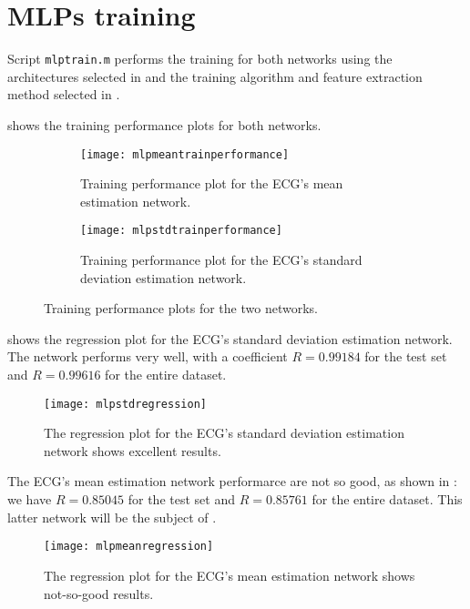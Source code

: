 \section{MLPs training}\label{sec:mlptraining}

Script \texttt{mlptrain.m} performs the training for both networks using the
architectures selected in  and the training
algorithm and feature extraction method selected in
.

 shows the training performance plots for both
networks. 

\begin{figure}[htbp]
	\centering
	\begin{subfigure}{\textwidth}
		\centering
		\texttt{[image: mlpmeantrainperformance]}
		\caption{Training performance plot for the ECG's mean
		estimation network.}\label{fig:mlpmeantrainperformance}
	\end{subfigure}
	\begin{subfigure}{\textwidth}
		\centering
		\texttt{[image: mlpstdtrainperformance]}
		\caption{Training performance plot for the ECG's standard
		deviation estimation network.}\label{fig:mlpstdtrainperformance}
	\end{subfigure}
	\caption{Training performance plots for the two
	networks.}\label{fig:mlptrainperformance}
\end{figure}

 shows the regression plot for the ECG's standard
deviation estimation network. The network performs very well, with a
coefficient \(R = 0.99184\) for the test set and \(R = 0.99616\) for the entire
dataset.

\begin{figure}[htbp]
	\centering
	\texttt{[image: mlpstdregression]}
	\caption{The regression plot for the ECG's standard deviation
	estimation network shows excellent
	results.}\label{fig:mlpstdregression}
\end{figure}

The ECG's mean estimation network performarce are not so good, as shown in
: we have \(R = 0.85045\) for the test set and
\(R = 0.85761\) for the entire dataset. This latter network will be the subject
of .

\begin{figure}[htbp]
	\centering
	\texttt{[image: mlpmeanregression]}
	\caption{The regression plot for the ECG's mean estimation network
	shows not-so-good results.}\label{fig:mlpmeanregression}
\end{figure}

